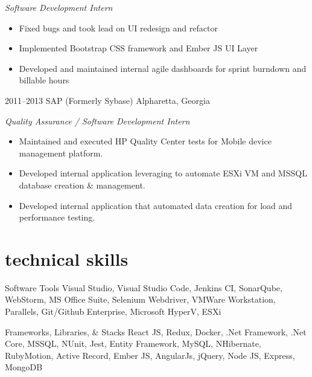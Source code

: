 \documentclass[]{friggeri-cv} %
\begin{document}
\begin{entrylist}
{  \emph{Software Development Intern}
  \begin{itemize}
    \item Fixed bugs and took lead on UI redesign and refactor
    \item Implemented Bootstrap CSS framework and Ember JS UI Layer
    \item Developed and maintained internal agile dashboards for sprint burndown and billable hours
  \end{itemize}
}
\entry
{2011--2013}
{SAP (Formerly Sybase)}
{Alpharetta, Georgia}
{\raggedright
  \emph{Quality Assurance / Software Development Intern}
  \begin{itemize}
    \item Maintained and executed HP Quality Center tests for Mobile device management platform.
    \item Developed internal application leveraging to automate ESXi VM and MSSQL database creation \& management.
    \item Developed internal application that automated data creation for load and performance testing. 
  \end{itemize}
}

\end{entrylist}

\pagebreak


\section{technical skills}
\begin{entrylist}
\entry
{}
{Software Tools}
{}
{Visual Studio, Visual Studio Code, Jenkins CI, SonarQube, WebStorm, MS Office Suite, 
Selenium Webdriver, VMWare Workstation, Parallels, Git/Github Enterprise, Microsoft HyperV, ESXi}

\entry
{}
{Frameworks, Libraries, \& Stacks}
{}
{React JS, Redux, Docker, .Net Framework, .Net Core, MSSQL, NUnit, Jest, Entity Framework, MySQL, NHibernate, 
RubyMotion, Active Record, Ember JS, AngularJs, jQuery, Node JS, Express, MongoDB}
\end{entrylist}
\end{document}
